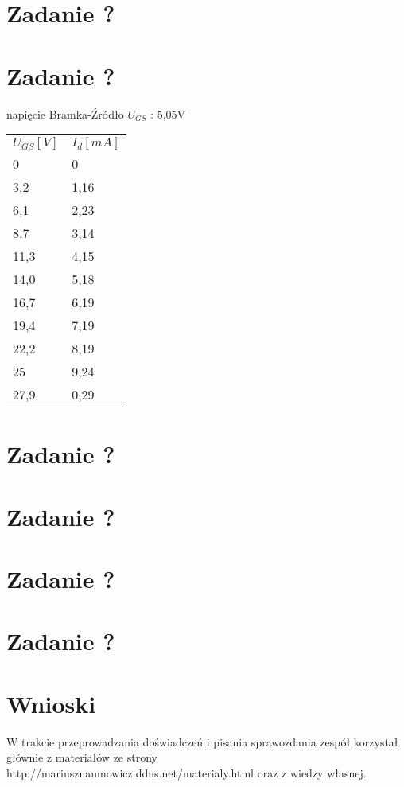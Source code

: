 \documentclass[polish,a4paper]{article}
\begin{document}
\section{Zadanie ?}

\section{Zadanie ?}
napięcie Bramka-Źródło $U_{GS}$ : 5,05V


\begin{center}
\begin{tabular}{|l|l|}
\hline
\textbf{$U_{GS} [V]$} & \textbf{$I_d [mA]$}\\
\hhline{|=|=|}

0 & 0\\
\hline
3,2 & 1,16 \\
\hline
6,1 & 2,23 \\
\hline
8,7 & 3,14 \\
\hline
11,3 & 4,15 \\
\hline
14,0 & 5,18 \\
\hline
16,7 & 6,19 \\
\hline
19,4 & 7,19 \\
\hline
22,2 & 8,19 \\
\hline
25 & 9,24 \\
\hline
27,9 & 0,29 \\
\hline

\end{tabular}
\end{center}


\section{Zadanie ?}
\section{Zadanie ?}
\section{Zadanie ?}
\section{Zadanie ?}


\section{Wnioski}




\begin{thebibliography}{9}

  W trakcie przeprowadzania doświadczeń i pisania sprawozdania zespół korzystał głównie z materiałów ze strony http://mariusznaumowicz.ddns.net/materialy.html oraz z wiedzy własnej.

\end{thebibliography}
\end{document}
